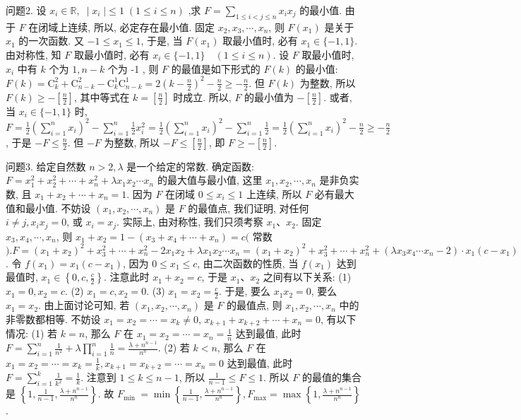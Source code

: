 问题2. 设 $x_{i}\in\mathbb{R},\;\;|\;x_{i}\;|\leq1\;(1\leq i\leq n)$ ,求 $F=\sum_{1\leq i<j\leq n}x_{i}x_{j}$ 的最小值.
由于 $F$ 在闭域上连续, 所以, 必定存在最小值.
固定 $x_2, x_3, \cdots, x_n$, 则 $F\left(x_1\right)$ 是关于 $x_1$ 的一次函数.
又 $-1 \leqslant x_1 \leqslant 1$, 于是, 当 $F\left(x_1\right)$ 取最小值时, 必有 $x_1 \in\{-1,1\}$. 由对称性, 知 $F$ 取最小值时, 必有 $x_i \in\{-1,1\} \quad(1 \leqslant i \leqslant n)$. 设 $F$ 取最小值时, $x_i$ 中有 $k$ 个为 $1, n-k$ 个为 -1 , 则 $F$ 的最值是如下形式的 $F(k)$ 的最小值: $F(k)=\mathrm{C}_k^2+\mathrm{C}_{n-k}^2-\mathrm{C}_k^1 \mathrm{C}_{n-k}^1=2\left(k-\frac{n}{2}\right)^2-\frac{n}{2} \geqslant-\frac{n}{2}$. 但 $F(k)$ 为整数, 所以 $F(k) \geqslant-\left[\frac{n}{2}\right]$, 其中等式在 $k=\left[\frac{n}{2}\right]$ 时成立.
所以, $F$ 的最小值为 $-\left[\frac{n}{2}\right]$. 或者, 当 $x_i \in\{-1,1\}$ 时, $F=\frac{1}{2}\left(\sum_{i=1}^n x_i\right)^2-\sum_{i=1}^n \frac{1}{2} x_i^2= \frac{1}{2}\left(\sum_{i=1}^n x_i\right)^2-\sum_{i=1}^n \frac{1}{2}=\frac{1}{2}\left(\sum_{i=1}^n x_i\right)^2-\frac{n}{2} \geqslant-\frac{n}{2}$, 于是 $-F \leqslant \frac{n}{2}$. 但 $-F$ 为整数, 所以 $-F \leqslant\left[\frac{n}{2}\right]$, 即 $F \geqslant-\left[\frac{n}{2}\right]$.



问题3. 给定自然数 $n>2, \lambda$ 是一个给定的常数.
确定函数: $F=x_1^2+x_2^2+\cdots+ x_n^2+\lambda x_1 x_2 \cdots x_n$ 的最大值与最小值, 这里 $x_1, x_2, \cdots, x_n$ 是非负实数, 且 $x_1+x_2+\cdots+x_n=1$. 
因为 $F$ 在闭域 $0 \leqslant x_i \leqslant 1$ 上连续, 所以 $F$ 必有最大值和最小值.
不妨设 $\left(x_1, x_2, \cdots, x_n\right)$ 是 $F$ 的最值点, 我们证明, 对任何 $i \neq j, x_i x_j=0$, 或 $x_i=x_j$. 实际上, 由对称性, 我们只须考察 $x_1 、 x_2$. 固定 $x_3, x_4, \cdots, x_n$, 则 $x_1+x_2=1-\left(x_3+x_4+\cdots+x_n\right)=c($ 常数 $) . F=\left(x_1+x_2\right)^2+x_3^2+\cdots+ x_n^2-2 x_1 x_2+\lambda x_1 x_2 \cdots x_n=\left(x_1+x_2\right)^2+x_3^2+\cdots+x_n^2+\left(\lambda x_3 x_4 \cdots x_n-2\right) \cdot x_1\left(c-x_1\right)$. 令 $f\left(x_1\right)=x_1\left(c-x_1\right)$, 因为 $0 \leqslant x_1 \leqslant c$, 由二次函数的性质, 当 $f\left(x_1\right)$ 达到最值时, $x_1 \in\left\{0, c, \frac{c}{2}\right\}$. 注意此时 $x_1+x_2=c$, 于是 $x_1 、 x_2$ 之间有以下关系: (1) $x_1=0, x_2=c$. (2) $x_1=c, x_2=0$. (3) $x_1=x_2=\frac{c}{2}$. 于是, 要么 $x_1 x_2=0$, 要么 $x_1=x_2$. 由上面讨论可知, 若 $\left(x_1, x_2, \cdots, x_n\right)$ 是 $F$ 的最值点, 则 $x_1, x_2, \cdots, x_n$ 中的非零数都相等.
不妨设 $x_1=x_2=\cdots=x_k \neq 0$, $x_{k+1}+x_{k+2}+\cdots+x_n=0$, 有以下情况: (1) 若 $k=n$, 那么 $F$ 在 $x_1=x_2=\cdots= x_n=\frac{1}{n}$ 达到最值, 此时 $F=\sum_{i=1}^n \frac{1}{n^2}+\lambda \prod_{i=1}^n \frac{1}{n}=\frac{\lambda+n^{n-1}}{n^n}$. (2) 若 $k<n$, 那么 $F$ 在 $x_1=x_2=\cdots=x_k=\frac{1}{k}, x_{k+1}=x_{k+2}=\cdots=x_n=0$ 达到最值, 此时 $F=\sum_{i=1}^k \frac{1}{k^2}=\frac{1}{k}$. 注意到 $1 \leqslant k \leqslant n-1$, 所以 $\frac{1}{n-1} \leqslant F \leqslant 1$. 所以 $F$ 的最值的集合是 $\left\{1, \frac{1}{n-1}, \frac{\lambda+n^{n-1}}{n^n}\right\}$. 故 $F_{\text {min }}=\min \left\{\frac{1}{n-1}, \frac{\lambda+n^{n-1}}{n^n}\right\}, F_{\max }= \max \left\{1, \frac{\lambda+n^{n-1}}{n^n}\right\}$.


